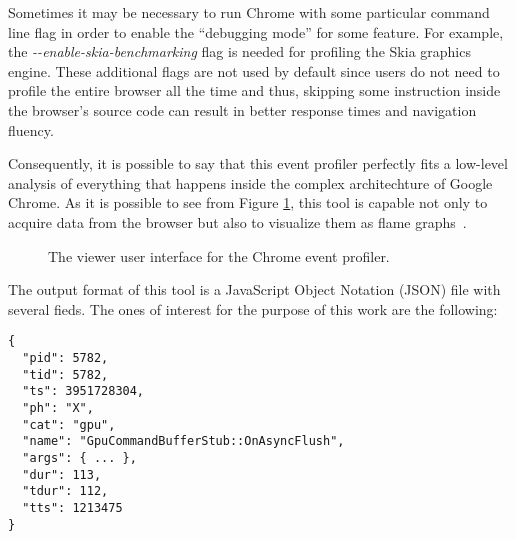Sometimes it may be necessary
to run Chrome with some particular command line flag in order to enable the
``debugging mode'' for some feature. For example, the \emph{-{}-enable-skia-benchmarking}
flag is needed for profiling the Skia graphics engine. These additional flags
are not used by default since users do not need to profile the entire browser
all the time and thus, skipping some instruction inside the browser's source code
can result in better response times and navigation fluency.

Consequently, it is possible
to say that this event profiler perfectly fits a low-level analysis of everything
that happens inside the complex architechture of Google Chrome.
As it is possible to see from Figure \ref{img:chrome_event_profiler}, this tool
is capable not only to acquire data from the browser but also to visualize them
as flame graphs~\cite{gregg2016flame}.
\begin{figure}[!htb]
    \caption{The viewer user interface for the Chrome event profiler.}
    \label{img:chrome_event_profiler}
\end{figure}

The output format of this tool is a JavaScript Object Notation (JSON) file with
several fieds. The ones of interest for the purpose of this work are the following:
\begin{lstlisting}
{
  "pid": 5782,
  "tid": 5782,
  "ts": 3951728304,
  "ph": "X",
  "cat": "gpu",
  "name": "GpuCommandBufferStub::OnAsyncFlush",
  "args": { ... },
  "dur": 113,
  "tdur": 112,
  "tts": 1213475
}
\end{lstlisting}


